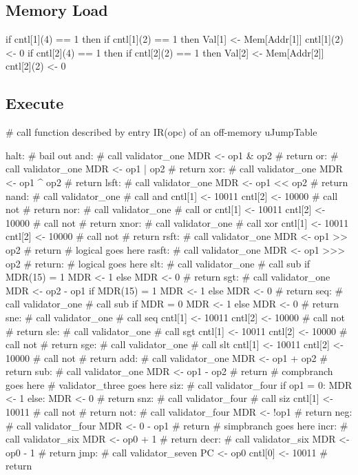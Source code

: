 \documentclass[12pt]{article}
\begin{document}
\subsection{Memory Load}
\begin{verbatimtab}
if cntl[1](4) == 1 then
    if cntl[1](2) == 1 then
        Val[1] <- Mem[Addr[1]]
        cntl[1](2) <- 0
if cntl[2](4) == 1 then
    if cntl[2](2) == 1 then
        Val[2] <- Mem[Addr[2]]
        cntl[2](2) <- 0
\end{verbatimtab}

\subsection{Execute}
\begin{verbatimtab}
# call function described by entry IR(opc) of an off-memory uJumpTable

halt:
# bail out
and:
    # call validator_one
    MDR <- op1 & op2
    # return
or:
    # call validator_one
    MDR <- op1 | op2
    # return
xor:
    # call validator_one
    MDR <- op1 ^ op2
    # return
lsft:
    # call validator_one
    MDR <- op1 << op2
    # return
nand:
    # call validator_one
    # call and
    cntl[1] <- 10011
    cntl[2] <- 10000
    # call not
    # return
nor:
    # call validator_one
    # call or
    cntl[1] <- 10011
    cntl[2] <- 10000
    # call not
    # return
xnor:
    # call validator_one
    # call xor
    cntl[1] <- 10011
    cntl[2] <- 10000
    # call not
    # return
rsft:
    # call validator_one
    MDR <- op1 >> op2
    # return
# logical goes here
rasft:
    # call validator_one
    MDR <- op1 >>> op2
    # return:
# logical goes here
slt:
    # call validator_one
    # call sub
    if MDR(15) = 1
        MDR <- 1
    else
        MDR <- 0
    # return
sgt:
    # call validator_one
    MDR <- op2 - op1
    if MDR(15) = 1
        MDR <- 1
    else
        MDR <- 0
    # return
seq:
    # call validator_one
    # call sub
    if MDR = 0
        MDR <- 1
    else
        MDR <- 0
    # return
sne:
    # call validator_one
    # call seq
    cntl[1] <- 10011
    cntl[2] <- 10000
    # call not
    # return
sle:
    # call validator_one
    # call sgt
    cntl[1] <- 10011
    cntl[2] <- 10000
    # call not
    # return
sge:
    # call validator_one
    # call slt
    cntl[1] <- 10011
    cntl[2] <- 10000
    # call not
    # return    
add:
    # call validator_one
    MDR <- op1 + op2
    # return
sub:
    # call validator_one
    MDR <- op1 - op2
    # return
# compbranch goes here
# validator_three goes here
siz:
    # call validator_four
    if op1 = 0:
       MDR <- 1
    else:
       MDR <- 0
    # return
snz:
    # call validator_four
    # call siz
    cntl[1] <- 10011 
    # call not
    # return
not:
    # call validator_four
    MDR <- !op1
    # return
neg:
    # call validator_four
    MDR <- 0 - op1
    # return
# simpbranch goes here
incr:
	# call validator_six
	MDR <- op0 + 1
	# return
decr:
	# call validator_six
	MDR <- op0 - 1
	# return
jmp:
    # call validator_seven
    PC <- op0
    cntl[0] <- 10011
    # return


\end{verbatimtab}
\end{document}
